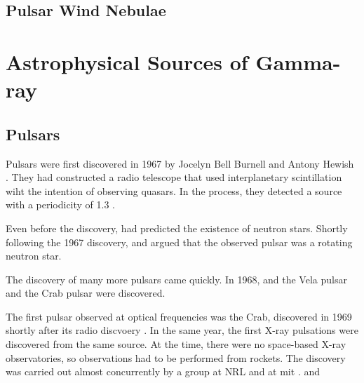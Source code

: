 
\subsection{Pulsar Wind Nebulae}





\section{Astrophysical Sources of Gamma-ray}
\subsection{Pulsars}



Pulsars were first discovered in 1967 by Jocelyn Bell Burnell and Antony
Hewish \citep{hewish_1968_observation-rapidly}. They had constructed a
radio telescope that used interplanetary scintillation wiht the intention
of observing quasars.  In the process, they detected a source with a
periodicity of 1.3 \second.

Even before the discovery, \cite{pacini_1967_energy-emission} had predicted
the existence of neutron stars.  Shortly following the 1967 discovery,
\cite{gold_1968_rotating-neutron} and \cite{pacini_1968_rotating-neutron}
argued that the observed pulsar was a rotating neutron star.

The discovery of many more pulsars came quickly.  In 1968, and the
Vela pulsar \citep{large_1968_pulsar-supernova} and the Crab pulsar
\cite{staelin_1968_pulsating-radio} were discovered.

The first pulsar observed at optical frequencies was the
Crab, discovered in 1969 shortly after its radio discvoery
\citep{cocke_1969_discovery-optical}.
In the same year, the first X-ray pulsations were discovered from
the same source. At the time, there were no space-based X-ray
observatories, so observations had to be performed from rockets.
The discovery was carried out almost concurrently by a group
at \ac{NRL} \citep{fritz_1969_x-ray-pulsar} and at \ac{mit}
\citep{bradt_1969_x-ray-optical}.  and



